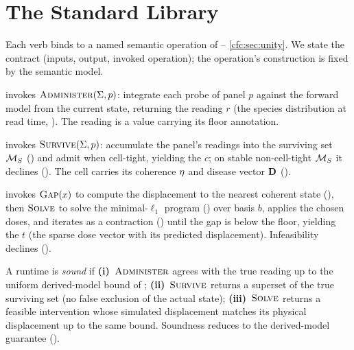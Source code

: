 \section{The Standard Library}
\label{cfc:sec:stdlib}

Each  verb binds to a named semantic operation of --%
\ref{cfc:sec:unity}. We state the contract (inputs, output, invoked operation); the
operation's construction is fixed by the semantic model.

\begin{definition}
\label{cfc:def:administer}
 invokes $\textsc{Administer}(\Sigma,p)$: integrate each
probe of panel $p$ against the forward model from the current state, returning
the reading $r$ (the species distribution at read time, ). The
reading is a  value carrying its floor annotation.
\end{definition}

\begin{definition}
\label{cfc:def:localize}
 invokes
$\textsc{Survive}(\Sigma,p)$: accumulate the panel's readings into the surviving
set $\mathcal{M}_S$ () and admit when cell-tight, yielding the
 $c$; on stable non-cell-tight $\mathcal{M}_S$ it declines
(). The cell carries its coherence $\eta$ and disease vector
$\mathbf{D}$ ().
\end{definition}

\begin{definition}
\label{cfc:def:close}
invokes $\textsc{Gap}(x)$ to compute the displacement to the nearest coherent
state (), then $\textsc{Solve}$ to solve the minimal-$\ell_1$
program () over basis $b$, applies the chosen doses, and
iterates as a contraction () until the gap is below the
floor, yielding the  $t$ (the sparse dose vector with its
predicted displacement). Infeasibility declines
().
\end{definition}

\begin{definition}
\label{cfc:def:soundness}
A  runtime is \emph{sound} if \textbf{(i)}~$\textsc{Administer}$ agrees
with the true reading up to the uniform derived-model bound of
; \textbf{(ii)}~$\textsc{Survive}$ returns a superset of the
true surviving set (no false exclusion of the actual state);
\textbf{(iii)}~$\textsc{Solve}$ returns a feasible intervention whose simulated
displacement matches its physical displacement up to the same bound. Soundness
reduces to the derived-model guarantee ().
\end{definition}

